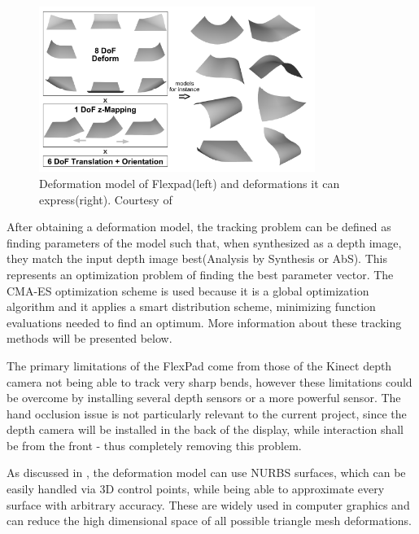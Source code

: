 \documentclass[]{article}
\begin{document}
\begin{figure}[hbtp]
    \centering
    \includegraphics[width=0.8\textwidth]{figures/FlexpadDeformationModel.PNG}
    \caption{Deformation model of Flexpad(left) and deformations it can express(right). Courtesy of \cite{steimle13}}
    \label{fig:flexpad_deformation}
\end{figure}


After obtaining a deformation model, the tracking problem can be defined as finding parameters of the model such that, when synthesized as a depth image, they match the input depth image best(Analysis by Synthesis or AbS). This represents an optimization problem of finding the best parameter vector. The CMA-ES optimization scheme is used because it is a global optimization algorithm and it applies a smart distribution scheme, minimizing function evaluations needed to find an optimum. More information about these tracking methods will be presented below.

The primary limitations of the FlexPad come from those of the Kinect depth camera not being able to track very sharp bends, however these limitations could be overcome by installing several depth sensors or a more powerful sensor. The hand occlusion issue is not particularly relevant to the current project, since the depth camera will be installed in the back of the display, while interaction shall be from the front  - thus completely removing this problem.

As discussed in \cite{jordt12}, the deformation model can use NURBS surfaces, which can be easily handled via 3D control points, while being able to approximate every surface with arbitrary accuracy. These are widely used in computer graphics and can reduce the high dimensional space of all possible triangle mesh deformations.
\end{document}
